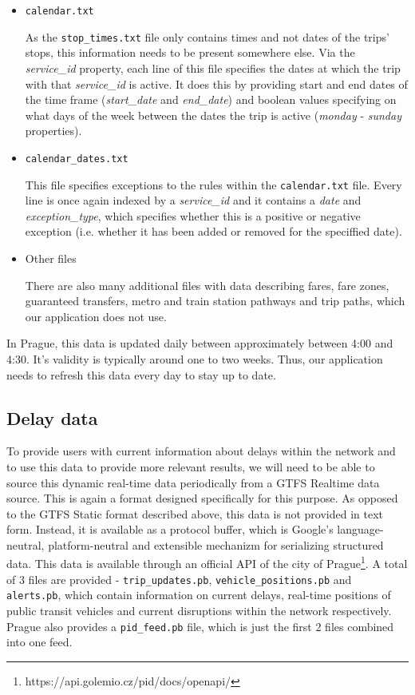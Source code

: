 \begin{itemize}
    \item \texttt{calendar.txt}

    As the \texttt{stop\_times.txt} file only contains times and not dates of the trips' stops, this information needs to be present somewhere else. Via the \textit{service\_id} property, each line of this file specifies the dates at which the trip with that \textit{service\_id} is active. It does this by providing start and end dates of the time frame (\textit{start\_date} and \textit{end\_date}) and boolean values specifying on what days of the week between the dates the trip is active (\textit{monday} - \textit{sunday} properties).

    \item \texttt{calendar\_dates.txt}

    This file specifies exceptions to the rules within the \texttt{calendar.txt} file. Every line is once again indexed by a \textit{service\_id} and it contains a \textit{date} and \textit{exception\_type}, which specifies whether this is a positive or negative exception (i.e. whether it has been added or removed for the speciffied date).

    \item Other files

    There are also many additional files with data describing fares, fare zones, guaranteed transfers, metro and train station pathways and trip paths, which our application does not use.
\end{itemize}

In Prague, this data is updated daily between approximately between 4:00 and 4:30\cite{pidopendata}. It's validity is typically around one to two weeks. Thus, our application needs to refresh this data every day to stay up to date.

\subsection{Delay data}

To provide users with current information about delays within the network and to use this data to provide more relevant results, we will need to be able to source this dynamic real-time data periodically from a GTFS Realtime data source. This is again a format designed specifically for this purpose. As opposed to the GTFS Static format described above, this data is not provided in text form. Instead, it is available as a protocol buffer\cite{gtfs2024}, which is Google's language-neutral, platform-neutral and extensible mechanizm for serializing structured data\cite{protobuf2024}. This data is available through an official API of the city of Prague\footnote{https://api.golemio.cz/pid/docs/openapi/}. A total of 3 files are provided - \texttt{trip\_updates.pb}, \texttt{vehicle\_positions.pb} and \texttt{alerts.pb}, which contain information on current delays, real-time positions of public transit vehicles and current disruptions within the network respectively. Prague also provides a \texttt{pid\_feed.pb} file, which is just the first 2 files combined into one feed.

